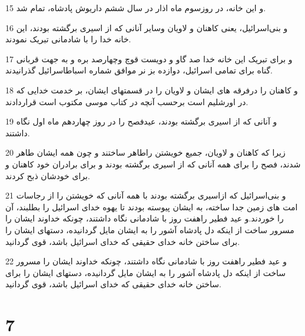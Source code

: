 \par 15 و این خانه، در روزسوم ماه اذار در سال ششم داریوش پادشاه، تمام شد.
\par 16 و بنی‌اسرائیل، یعنی کاهنان و لاویان وسایر آنانی که از اسیری برگشته بودند، این خانه خدا را با شادمانی تبریک نمودند.
\par 17 و برای تبریک این خانه خدا صد گاو و دویست قوچ وچهارصد بره و به جهت قربانی گناه برای تمامی اسرائیل، دوازده بز نر موافق شماره اسباطاسرائیل گذرانیدند.
\par 18 و کاهنان را درفرقه های ایشان و لاویان را در قسمتهای ایشان، بر خدمت خدایی که در اورشلیم است برحسب آنچه در کتاب موسی مکتوب است قراردادند.
\par 19 و آنانی که از اسیری برگشته بودند، عیدفصح را در روز چهاردهم ماه اول نگاه داشتند.
\par 20 زیرا که کاهنان و لاویان، جمیع خویشتن راطاهر ساختند و چون همه ایشان طاهر شدند، فصح را برای همه آنانی که از اسیری برگشته بودند و برای برادران خود کاهنان و برای خودشان ذبح کردند.
\par 21 و بنی‌اسرائیل که ازاسیری برگشته بودند با همه آنانی که خویشتن را از رجاسات امت های زمین جدا ساخته، به ایشان پیوسته بودند تا یهوه خدای اسرائیل را بطلبند، آن را خوردند.و عید فطیر راهفت روز با شادمانی نگاه داشتند، چونکه خداوند ایشان را مسرور ساخت از اینکه دل پادشاه آشور را به ایشان مایل گردانیده، دستهای ایشان را برای ساختن خانه خدای حقیقی که خدای اسرائیل باشد، قوی گردانید.
\par 22 و عید فطیر راهفت روز با شادمانی نگاه داشتند، چونکه خداوند ایشان را مسرور ساخت از اینکه دل پادشاه آشور را به ایشان مایل گردانیده، دستهای ایشان را برای ساختن خانه خدای حقیقی که خدای اسرائیل باشد، قوی گردانید.
 
\chapter{7}

